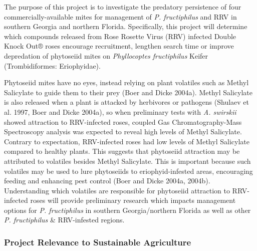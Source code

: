 \documentclass[12pt,final,CPage]{ufthesis}
\begin{document}
{  The purpose of this project is to investigate the predatory persistence of four commercially-available mites for management of \emph{P. fructiphilus} and RRV in southern Georgia and northern Florida. Specifically, this project will determine which compounds released from Rose Rosette Virus (RRV) infected Double Knock Out® roses encourage recruitment, lengthen search time or improve depredation of phytoseiid mites on \emph{Phyllocoptes fructiphilus} Keifer (Trombidiformes: Eriophyidae).

  Phytoseiid mites have no eyes, instead relying on plant volatiles such as Methyl Salicylate to guide them to their prey (Boer and Dicke 2004a). Methyl Salicylate is also released when a plant is attacked by herbivores or pathogens (Shulaev et al. 1997, Boer and Dicke 2004a), so when preliminary tests with \emph{A. swirskii} showed attraction to RRV-infected roses, coupled Gas Chromatography-Mass Spectroscopy analysis was expected to reveal high levels of Methyl Salicylate. Contrary to expectation, RRV-infected roses had low levels of Methyl Salicylate compared to healthy plants. This suggests that phytoseiid attraction may be attributed to volatiles besides Methyl Salicylate. This is important because such volatiles may be used to lure phytoseiids to eriophyid-infested areas, encouraging feeding and enhancing pest control (Boer and Dicke 2004a, 2004b). Understanding which volatiles are responsible for phytoseiid attraction to RRV-infected roses will provide preliminary research which impacts management options for \emph{P. fructiphilus} in southern Georgia/northern Florida as well as other \emph{P. fructiphilus} \& RRV-infested regions.

  \hypertarget{project-relevance-to-sustainable-agriculture}{%
  \subsubsection{Project Relevance to Sustainable Agriculture}\label{project-relevance-to-sustainable-agriculture}}

}
\end{document}
